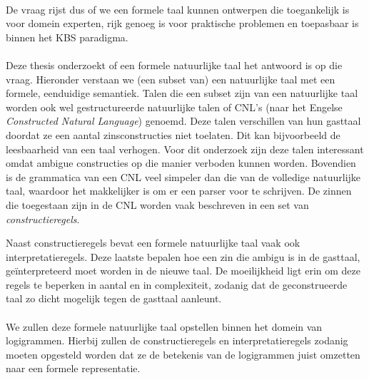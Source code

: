 \paragraph{} De vraag rijst dus of we een formele taal kunnen ontwerpen die toegankelijk is voor domein experten, rijk genoeg is voor praktische problemen en toepasbaar is binnen het KBS paradigma.

\paragraph{} Deze thesis onderzoekt of een formele natuurlijke taal het antwoord is op die vraag. Hieronder verstaan we (een subset van) een natuurlijke taal met een formele, eenduidige semantiek. Talen die een subset zijn van een natuurlijke taal worden ook wel gestructureerde natuurlijke talen of CNL's (naar het Engelse \textit{Constructed Natural Language}) genoemd. Deze talen verschillen van hun gasttaal doordat ze een aantal zinsconstructies niet toelaten. Dit kan bijvoorbeeld de leesbaarheid van een taal verhogen. Voor dit onderzoek zijn deze talen interessant omdat ambigue constructies op die manier verboden kunnen worden. Bovendien is de grammatica van een CNL veel simpeler dan die van de volledige natuurlijke taal, waardoor het makkelijker is om er een parser voor te schrijven. De zinnen die toegestaan zijn in de CNL worden vaak beschreven in een set van \textit{constructieregels}.

Naast constructieregels bevat een formele natuurlijke taal vaak ook interpretatieregels. Deze laatste bepalen hoe een zin die ambigu is in de gasttaal, geïnterpreteerd moet worden in de nieuwe taal. De moeilijkheid ligt erin om deze regels te beperken in aantal en in complexiteit, zodanig dat de geconstrueerde taal zo dicht mogelijk tegen de gasttaal aanleunt.

\paragraph{} We zullen deze formele natuurlijke taal opstellen binnen het domein van logigrammen. Hierbij zullen de constructieregels en interpretatieregels zodanig moeten opgesteld worden dat ze de betekenis van de logigrammen juist omzetten naar een formele representatie.


